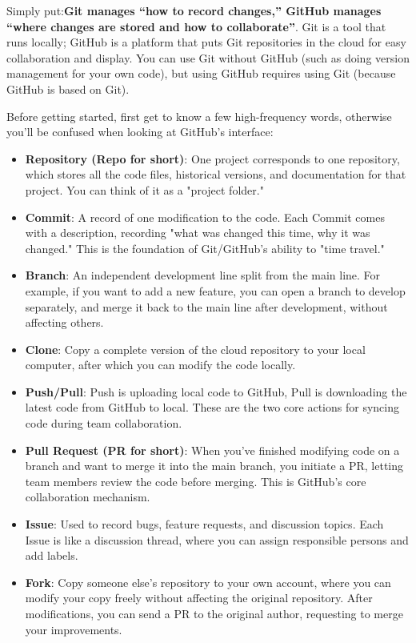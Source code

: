 Simply put:\textbf{Git manages “how to record changes,” GitHub manages “where changes are stored and how to collaborate”}. Git is a tool that runs locally; GitHub is a platform that puts Git repositories in the cloud for easy collaboration and display. You can use Git without GitHub (such as doing version management for your own code), but using GitHub requires using Git (because GitHub is based on Git).



Before getting started, first get to know a few high-frequency words, otherwise you'll be confused when looking at GitHub's interface:

\begin{itemize}
  \item \textbf{Repository (Repo for short)}: One project corresponds to one repository, which stores all the code files, historical versions, and documentation for that project. You can think of it as a "project folder."
  \item \textbf{Commit}: A record of one modification to the code. Each Commit comes with a description, recording "what was changed this time, why it was changed." This is the foundation of Git/GitHub's ability to "time travel."
  \item \textbf{Branch}: An independent development line split from the main line. For example, if you want to add a new feature, you can open a branch to develop separately, and merge it back to the main line after development, without affecting others.
  \item \textbf{Clone}: Copy a complete version of the cloud repository to your local computer, after which you can modify the code locally.
  \item \textbf{Push/Pull}: Push is uploading local code to GitHub, Pull is downloading the latest code from GitHub to local. These are the two core actions for syncing code during team collaboration.
  \item \textbf{Pull Request (PR for short)}: When you've finished modifying code on a branch and want to merge it into the main branch, you initiate a PR, letting team members review the code before merging. This is GitHub's core collaboration mechanism.
  \item \textbf{Issue}: Used to record bugs, feature requests, and discussion topics. Each Issue is like a discussion thread, where you can assign responsible persons and add labels.
  \item \textbf{Fork}: Copy someone else's repository to your own account, where you can modify your copy freely without affecting the original repository. After modifications, you can send a PR to the original author, requesting to merge your improvements.
\end{itemize}

